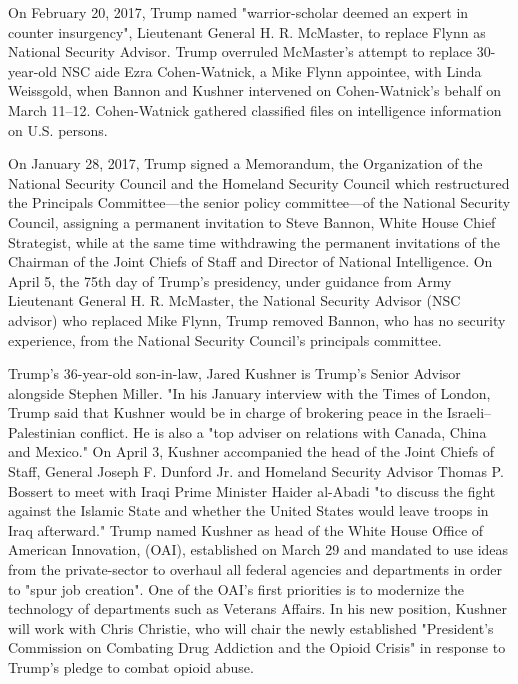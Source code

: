 On February 20, 2017, Trump named "warrior-scholar deemed an expert in
counter insurgency", Lieutenant General H. R. McMaster, to replace Flynn
as National Security Advisor. Trump overruled McMaster's attempt to
replace 30-year-old NSC aide Ezra Cohen-Watnick, a Mike Flynn appointee,
with Linda Weissgold, when Bannon and Kushner intervened on
Cohen-Watnick's behalf on March 11--12. Cohen-Watnick gathered
classified files on intelligence information on U.S. persons.

On January 28, 2017, Trump signed a Memorandum, the Organization of the
National Security Council and the Homeland Security Council which
restructured the Principals Committee---the senior policy committee---of
the National Security Council, assigning a permanent invitation to Steve
Bannon, White House Chief Strategist, while at the same time withdrawing
the permanent invitations of the Chairman of the Joint Chiefs of Staff
and Director of National Intelligence. On April 5, the 75th day of
Trump's presidency, under guidance from Army Lieutenant General H. R.
McMaster, the National Security Advisor (NSC advisor) who replaced Mike
Flynn, Trump removed Bannon, who has no security experience, from the
National Security Council's principals committee.

Trump's 36-year-old son-in-law, Jared Kushner is Trump's Senior Advisor
alongside Stephen Miller. "In his January interview with the Times of
London, Trump said that Kushner would be in charge of brokering peace in
the Israeli--Palestinian conflict. He is also a "top adviser on
relations with Canada, China and Mexico." On April 3, Kushner
accompanied the head of the Joint Chiefs of Staff, General Joseph F.
Dunford Jr. and Homeland Security Advisor Thomas P. Bossert to meet with
Iraqi Prime Minister Haider al-Abadi "to discuss the fight against the
Islamic State and whether the United States would leave troops in Iraq
afterward." Trump named Kushner as head of the White House Office of
American Innovation, (OAI), established on March 29 and mandated to use
ideas from the private-sector to overhaul all federal agencies and
departments in order to "spur job creation". One of the OAI's first
priorities is to modernize the technology of departments such as
Veterans Affairs. In his new position, Kushner will work with Chris
Christie, who will chair the newly established "President's Commission
on Combating Drug Addiction and the Opioid Crisis" in response to
Trump's pledge to combat opioid abuse.

